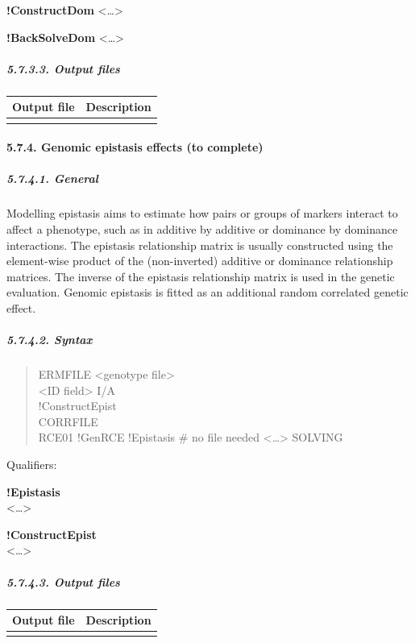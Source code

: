\textbf{!ConstructDom} \textless\ldots\textgreater{}

\textbf{!BackSolveDom} \textless\ldots\textgreater{}

\subparagraph{5.7.3.3. Output files}\label{Gene69}

{\def\LTcaptype{none} %
\begin{longtable}[]{@{}ll@{}}
\toprule\noalign{}
Output file & Description \\
\midrule\noalign{}
\endhead
\bottomrule\noalign{}
\endlastfoot
& \\
\end{longtable}
}

\paragraph{5.7.4. Genomic epistasis effects (to complete)}\label{Gene70}

\subparagraph{5.7.4.1. General}\label{Gene71}

Modelling epistasis aims to estimate how pairs or groups of markers
interact to affect a phenotype, such as in additive by additive or
dominance by dominance interactions. The epistasis relationship matrix
is usually constructed using the element-wise product of the
(non-inverted) additive or dominance relationship matrices. The inverse
of the epistasis relationship matrix is used in the genetic evaluation.
Genomic epistasis is fitted as an additional random correlated genetic
effect.

\subparagraph{5.7.4.2. Syntax}\label{Gene72}

\begin{quote}
ERMFILE \textless genotype file\textgreater{}\\
\textless ID field\textgreater{} I/A\\
!ConstructEpist\\
CORRFILE\\
RCE01 !GenRCE !Epistasis \# no file needed \textless\ldots\textgreater{}
SOLVING
\end{quote}

Qualifiers:

\textbf{!Epistasis}\\
\textless\ldots\textgreater{}

\textbf{!ConstructEpist}\\
\textless\ldots\textgreater{}

\subparagraph{5.7.4.3. Output files}\label{Gene73}

{\def\LTcaptype{none} %
\begin{longtable}[]{@{}ll@{}}
\toprule\noalign{}
Output file & Description \\
\midrule\noalign{}
\endhead
\bottomrule\noalign{}
\endlastfoot
& \\
\end{longtable}
}

